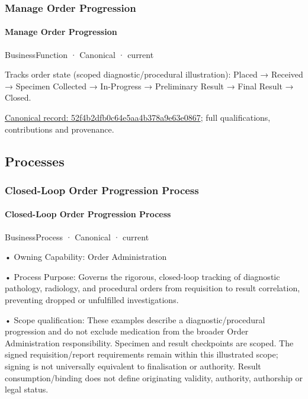 \subsubsection{Manage Order Progression}

\paragraph{Manage Order Progression}

\label{element:52f4b2dfb0c64e5aa4b378a9e63e0867}
{\small BusinessFunction · Canonical · current}\par

Tracks order state (scoped diagnostic/procedural illustration): Placed → Received → Specimen Collected → In-Progress → Preliminary Result → Final Result → Closed.


{\footnotesize \href{../../../../continuum/business/business-function/52f4b2dfb0c64e5aa4b378a9e63e0867.md}{Canonical record: 52f4b2dfb0c64e5aa4b378a9e63e0867}; full qualifications, contributions and provenance.}\par
\subsection{Processes}

\subsubsection{Closed-Loop Order Progression Process}

\paragraph{Closed-Loop Order Progression Process}

\label{element:e19a7c9594a4401e92450e4c31598982}
{\small BusinessProcess · Canonical · current}\par

•
Owning Capability: Order Administration



•
Process Purpose: Governs the rigorous, closed-loop tracking of diagnostic pathology, radiology, and procedural orders from requisition to result correlation, preventing dropped or unfulfilled investigations.



•
Scope qualification: These examples describe a diagnostic/procedural progression and do not exclude medication from the broader Order Administration responsibility. Specimen and result checkpoints are scoped. The signed requisition/report requirements remain within this illustrated scope; signing is not universally equivalent to finalisation or authority. Result consumption/binding does not define originating validity, authority, authorship or legal status.



